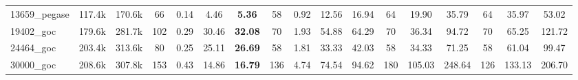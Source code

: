 \begin{tabular}{|l|c|c|cccc|cccc|ccc|ccc|}
13659\_pegase 
& 117.4k
& 170.6k
& 66 
&  0.14
&  4.46
&  {\bf 5.36}
& 58 
&  0.92
& 12.56
& 16.94
& 64 
& 19.90
& 35.79
& 64 
& 35.97
& 53.02
\\

19402\_goc 
& 179.6k
& 281.7k
& 102 
&  0.29
& 30.46
& {\bf 32.08}
& 70 
&  1.93
& 54.88
& 64.29
& 70 
& 36.34
& 94.72
& 70 
& 65.25
& 121.72
\\

24464\_goc 
& 203.4k
& 313.6k
& 80 
&  0.25
& 25.11
& {\bf 26.69}
& 58 
&  1.81
& 33.33
& 42.03
& 58 
& 34.33
& 71.25
& 58 
& 61.04
& 99.47
\\

30000\_goc 
& 208.6k
& 307.8k
& 153 
&  0.43
& 14.86
& {\bf 16.79}
& 136 
&  4.74
& 74.54
& 94.62
& 180 
& 105.03
& 248.64
& 126 
& 133.13
& 206.70

  \\
  \hline
\end{tabular}